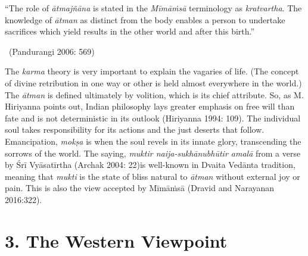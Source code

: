 \begin{myquote}
“The role of \textit{ātmajñāna} is stated in the \textit{Mīmāṁsā} terminology as \textit{kratvartha}. The knowledge of \textit{ātman} as distinct from the body enables a person to undertake sacrifices which yield results in the other world and after this birth.” 

~\hfill (Pandurangi 2006: 569)
\end{myquote}

The \textit{karma} theory is very important to explain the vagaries of life. (The concept of divine retribution in one way or other is held almost everywhere in the world.) The \textit{ātman} is defined ultimately by volition, which is its chief attribute. So, as M. Hiriyanna points out, Indian philosophy lays greater emphasis on free will than fate and is not deterministic in its outlook (Hiriyanna 1994: 109). The individual soul takes responsibility for its actions and the just deserts that follow. Emancipation, \textit{mokṣa} is when the soul revels in its innate glory, transcending the sorrows of the world. The saying, \textit{muktir naija-sukhānubhūtir amalā} from a verse by Śrī Vyāsatīrtha (Archak 2004: 22)is well-known in Dvaita Vedānta tradition, meaning that \textit{mukti} is the state of bliss natural to \textit{ātman} without external joy or pain. This is also the view accepted by Mīmāṁsā (Dravid and Narayanan 2016:322).

\vspace{-.3cm}

\section*{3. The Western Viewpoint}

